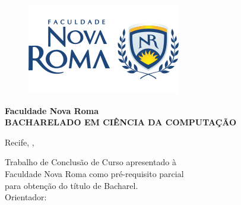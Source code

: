 \documentclass{tcc}
\begin{document}
\pagestyle{empty} %


\begin{figure}[H]
\centering
\includegraphics[scale=2]{imagens/logo.png}
\end{figure}
\begin{center}
\textbf{\large{Faculdade Nova Roma}}\\
\textbf{\large{BACHARELADO EM CIÊNCIA DA COMPUTAÇÃO}}
\end{center}

\vspace{5em}

\begin{center}
\Large{\bf \MakeUppercase {\theauthor}}
\end{center}
\vspace{2em}
\begin{center}
\LARGE{\bf \MakeUppercase{\thetitle}}
\end{center}

\vfill






\vspace{2in}

\begin{center}
Recife, \MONTH, \the\year
\end{center}

\newpage
\begin{center}
\Large{\bf \MakeUppercase{\theauthor}}
\end{center}
\vspace{3in}
\begin{center}
\LARGE{\bf \thetitle}


\end{center}

\vspace{2in}

\begin{flushright}
Trabalho de Conclusão de Curso apresentado à \\Faculdade Nova Roma como pré-requisito parcial\\ para obtenção do título de Bacharel.\\
\vspace{0.2in}
Orientador: \orientador
\end{flushright}
\end{document}
